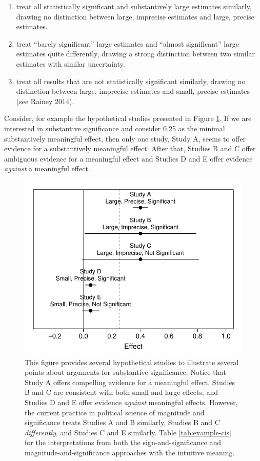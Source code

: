 \documentclass[12pt]{article}
\begin{document}
\begin{enumerate}
\item treat all statistically significant and substantively large estimates similarly, drawing no distinction between large, imprecise estimates and large, precise estimates.
\item treat ``barely significant'' large estimates and ``almost significant'' large estimates quite differently, drawing a strong distinction between two similar estimates with similar uncertainty.
\item treat all results that are not statistically significant similarly, drawing no distinction between large, imprecise estimates and small, precise estimates (see Rainey 2014).
\end{enumerate}

Consider, for example the hypothetical studies presented in Figure \ref{fig:example-cis}. If we are interested in substantive significance and consider 0.25 as the minimal substantively meaningful effect, then only one study, Study A, seems to offer evidence for a substantively meaningful effect. After that, Studies B and C offer ambiguous evidence for a meaningful effect and Studies D and E offer evidence \emph{against} a meaningful effect.

\begin{figure}[H]
\begin{center}
\includegraphics[scale = .8]{figs/example-cis.pdf}
\caption{This figure provides several hypothetical studies to illustrate several points about arguments for substantive significance. Notice that Study A offers compelling evidence for a meaningful effect, Studies B and C are consistent with both small and large effects, and Studies D and E offer evidence \emph{against} meaningful effects. However, the current practice in political science of magnitude and significance treats Studies A and B similarly, Studies B and C \emph{differently}, and Studies C and E similarly. Table \ref{tab:example-cis} for the interpretations from both the sign-and-significance and magnitude-and-significance approaches with the intuitive meaning.}\label{fig:example-cis}
\end{center}
\end{figure}
\end{document}
